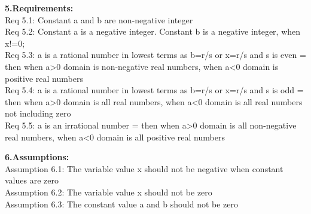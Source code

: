 \documentclass[a4paper,10pt]{article}
\begin{document}
\newpage
{\Large\textbf{5.Requirements:}\\}
\newline
\indent\indent
{\fontsize{12}{16}\selectfont Req 5.1: Constant a and b are non-negative integer \\}
\newline
\indent\indent
{\fontsize{12}{16}\selectfont Req 5.2: Constant a is a negative integer. Constant b is a negative integer, when x!=0; \\}
\newline
\indent\indent
{\fontsize{12}{16}\selectfont Req 5.3: a is a rational number in lowest terms as b=r/s or x=r/s and s is even = then when a>0 domain is non-negative real numbers, when a<0 domain is positive real numbers\\}
\newline
\indent\indent
{\fontsize{12}{16}\selectfont Req 5.4: a is a rational number in lowest terms as b=r/s or x=r/s and s is odd = then when a>0 domain is all real numbers, when a<0 domain is all real numbers not including zero \\}
\newline
\indent\indent
{\fontsize{12}{16}\selectfont Req 5.5: a is an  irrational number = then when a>0 domain is all non-negative real numbers, when a<0 domain is all positive real numbers \\}

{\Large\textbf{6.Assumptions:}\\}
\newline
\indent\indent
{\fontsize{12}{16}\selectfont Assumption 6.1: The variable value x should not be negative when constant values are zero \\}
\newline
\indent\indent
{\fontsize{12}{16}\selectfont Assumption 6.2: The variable value x should not be zero \\}
\newline
\indent\indent
{\fontsize{12}{16}\selectfont Assumption 6.3: The constant value a and b should not be zero \\}
\end{document}
